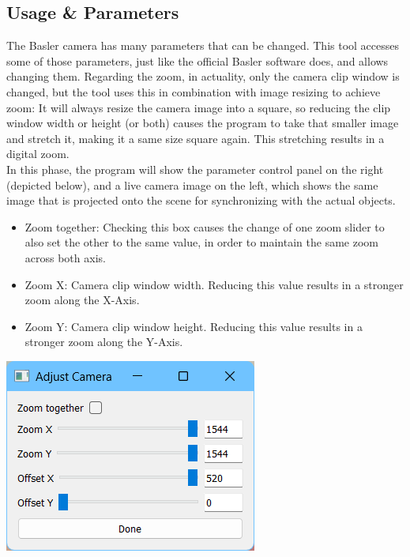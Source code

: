 \documentclass[12pt]{article}
\begin{document}
\subsection{Usage \& Parameters}
The Basler camera has many parameters that can be changed. This tool accesses some of those parameters, just like the official Basler software does, and allows changing them. Regarding the zoom, in actuality, only the camera clip window is changed, but the tool uses this in combination with image resizing to achieve zoom: It will always resize the camera image into a square, so reducing the clip window width or height (or both) causes the program to take that smaller image and stretch it, making it a same size square again. This stretching results in a digital zoom.\\
In this phase, the program will show the parameter control panel on the right (depicted below), and a live camera image on the left, which shows the same image that is projected onto the scene for synchronizing with the actual objects.\\
\begin{minipage}[t]{0.45\textwidth}
	\vspace{0pt}
	\begin{itemize}
		\item Zoom together: Checking this box causes the change of one zoom slider to also set the other to the same value, in order to maintain the same zoom across both axis.
		\item Zoom X: Camera clip window width. Reducing this value results in a stronger zoom along the X-Axis.
		\item Zoom Y: Camera clip window height. Reducing this value results in a stronger zoom along the Y-Axis.
	\end{itemize}
\end{minipage}
\hspace{\fill}
\begin{minipage}[t]{0.45\textwidth}
	\vspace{0pt}
	\includegraphics*[width=\textwidth]{images/projsync.png}
\end{minipage}
\end{document}

